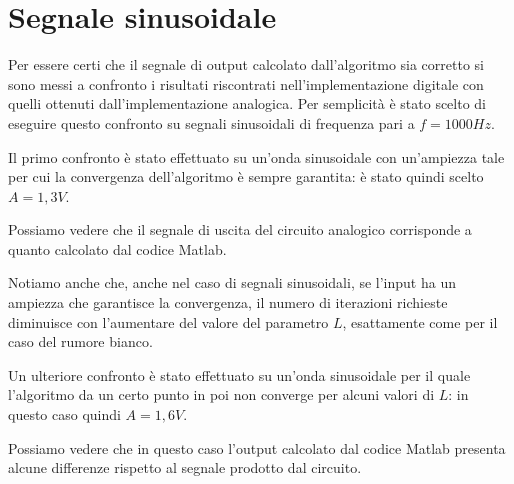 		\pagebreak
	
	\section{Segnale sinusoidale}
		Per essere certi che il segnale di output calcolato dall'algoritmo sia corretto si sono messi a confronto i risultati riscontrati nell'implementazione digitale con quelli ottenuti dall'implementazione analogica. Per semplicità è stato scelto di eseguire questo confronto su segnali sinusoidali di frequenza pari a $f = 1000Hz$.
	
		Il primo confronto è stato effettuato su un'onda sinusoidale con un'ampiezza tale per cui la convergenza dell'algoritmo è sempre garantita: è stato quindi scelto $A = 1,3V$.
	
		\pagebreak
	
		Possiamo vedere che il segnale di uscita del circuito analogico corrisponde a quanto calcolato dal codice Matlab.
	
	
		Notiamo anche che, anche nel caso di segnali sinusoidali, se l'input ha un ampiezza che garantisce la convergenza, il numero di iterazioni richieste diminuisce con l'aumentare del valore del parametro $L$, esattamente come per il caso del rumore bianco.
	
		\pagebreak
	
		Un ulteriore confronto è stato effettuato su un'onda sinusoidale per il quale l'algoritmo da un certo punto in poi non converge per alcuni valori di $L$: in questo caso quindi $A = 1,6V$.
	
	
		Possiamo vedere che in questo caso l'output calcolato dal codice Matlab presenta alcune differenze rispetto al segnale prodotto dal circuito.
	
		\pagebreak
		
